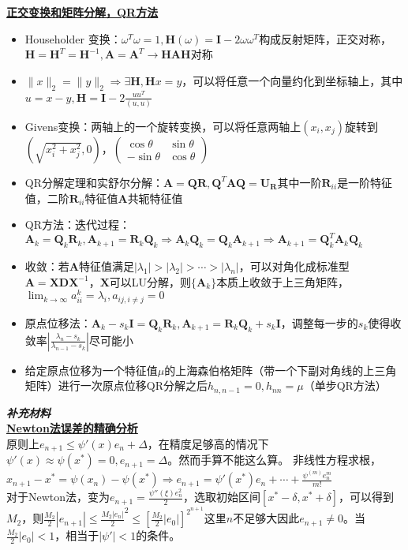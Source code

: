 \documentclass[UTF8,a4paper,landscape,compress]{paper}
\renewcommand{\subsection}[1]{{\small\textbf{\underline{#1}}}\\ }
\renewcommand{\section}[1]{{\normalsize\textbf{\emph{#1}}}\\ }
\newcommand{\List}[1]{\begin{itemize}[fullwidth,itemindent=0em] #1 \end{itemize}}
\begin{document}
\begin{multicols}{4}
        \subsection{正交变换和矩阵分解，QR方法}
        \List{
            \item{Householder 变换：$\omega^T\omega = 1, \bm H(\omega) = \bm I -2\omega\omega^T$构成反射矩阵，正交对称，$\bm H = \bm H^T = \bm H^{-1}, \bm A = \bm A^T \rightarrow \bm H\bm A\bm H$对称}
            \item {$\|x\|_2 = \|y\|_2 \Rightarrow \exists \bm H, \bm Hx = y$，可以将任意一个向量约化到坐标轴上，其中$u = x - y,\bm H = \bm I  - 2\frac{uu^T}{(u,u)}$}
            \item {Givens变换：两轴上的一个旋转变换，可以将任意两轴上$(x_i,x_j)$旋转到$(\sqrt{x_i^2+x_j^2},0)$，$\begin{pmatrix} \cos\theta & \sin\theta \\ -\sin\theta & \cos\theta\end{pmatrix}$}
            \item {QR分解定理和实舒尔分解：$\bm A = \bm Q\bm R,\bm Q^T\bm A\bm Q = \bm U_{\bm R}$其中一阶$\bm R_{ii}$是一阶特征值，二阶$\bm R_{ii}$特征值$\bm A$共轭特征值}
            \item {QR方法：迭代过程：$\bm A_k = \bm Q_k\bm R_k,\bm A_{k+1} = \bm R_k\bm Q_k \Rightarrow \bm A_k\bm Q_k = \bm Q_k\bm A_{k+1}\Rightarrow \bm A_{k+1} = \bm Q_k^T\bm A_k\bm Q_k$ }
            \item {收敛：若$\bm A$特征值满足$|\lambda_1| >|\lambda_2| >\cdots>|\lambda_n|$，可以对角化成标准型$\bm A = \bm X \bm D \bm X^{-1}$，$\bm X$可以LU分解，则$\{\bm A_k\}$本质上收敛于上三角矩阵，$\lim_{k\to\infty}a_{ii}^k = \lambda_i,a_{ij,i\ne j} = 0$}
            \item {原点位移法：$\bm A_k -s_k\bm I= \bm Q_k\bm R_k,\bm A_{k+1} = \bm R_k\bm Q_k + s_k\bm I$，调整每一步的$s_k$使得收敛率$|\frac{\lambda_n - s_k}{\lambda_{n-1}-s_k}|$尽可能小}
            \item {给定原点位移为一个特征值$\mu$的上海森伯格矩阵（带一个下副对角线的上三角矩阵）进行一次原点位移QR分解之后$h_{n,n-1} = 0,h_{nn} = \mu$（单步QR方法）}
            }
\section{补充材料}
    \subsection{Newton法误差的精确分析}
    原则上$e_{n+1} \le  \psi'(x)e_n + \Delta $，在精度足够高的情况下$\psi'(x) \approx \psi (x^*) = 0,e_{n+1} = \Delta$。然而手算不能这么算。
    非线性方程求根，$x_{n+1} - x^* = \psi(x_n) - \psi(x^*) \Rightarrow e_{n+1} = \psi'(x^*)e_n + \cdots + \frac{\psi^{(m)}e^m_n}{m!}$\\ 
    对于Newton法，变为$e_{n+1} = \frac{\psi''(\xi)e_n^2}2$，选取初始区间$[x^*-\delta,x^*+\delta]$，可以得到$M_2$，则$\frac{M_2}2|e_{n+1}| \le {\frac{M_2|e_n|}2} ^2 \le [\frac{M_2}2|e_0|]^{2^{n+1}}$这里$n$不足够大因此$e_{n+1} \ne 0$。当$\frac{M_2}2|e_0|<1$，相当于$|\psi'| < 1$的条件。\\

\end{multicols}
\end{document}
